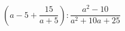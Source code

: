 \begin{ex}[type=expression]
	\begin{condition}
		\(\left( a-5+\dfrac{15}{a+5} \right):\dfrac{a^2-10}{a^2+10a+25}\)
	\end{condition}
\end{ex}